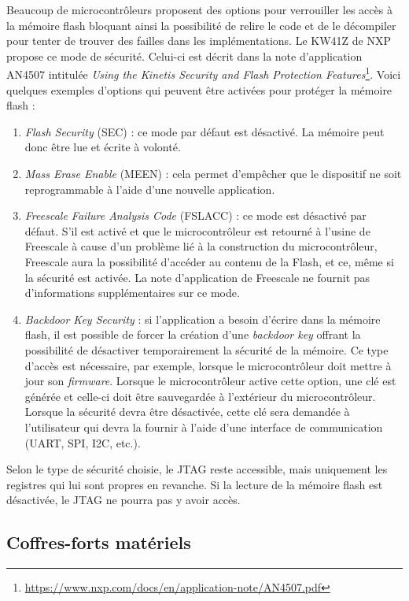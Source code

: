 Beaucoup de microcontrôleurs proposent des options pour verrouiller les accès à la mémoire flash bloquant ainsi la possibilité de relire le code et de le décompiler pour tenter de trouver des failles dans les implémentations. Le KW41Z de NXP propose ce mode de sécurité. Celui-ci est décrit dans la note d'application AN4507 intitulée \textit{Using the Kinetis Security and Flash Protection Features}\footnote{\url{https://www.nxp.com/docs/en/application-note/AN4507.pdf}}. Voici quelques exemples d'options qui peuvent être activées pour protéger la mémoire flash : 
\begin{enumerate}
    \item \textit{Flash Security} (SEC) : ce mode par défaut est désactivé. La mémoire peut donc être lue et écrite à volonté.
    \item \textit{Mass Erase Enable} (MEEN) : cela permet d'empêcher que le dispositif ne soit reprogrammable à l'aide d'une nouvelle application.
    \item \textit{Freescale Failure Analysis Code} (FSLACC) : ce mode est désactivé par défaut. S’il est activé et que le microcontrôleur est retourné à l'usine de Freescale à cause d'un problème lié à la construction du microcontrôleur, Freescale aura la possibilité d'accéder au contenu de la Flash, et ce, même si la sécurité est activée. La note d'application de Freescale ne fournit pas d'informations supplémentaires sur ce mode.
    \item \textit{Backdoor Key Security} : si l'application a besoin d'écrire dans la mémoire flash, il est possible de forcer la création d'une \textit{backdoor key} offrant la possibilité de désactiver temporairement la sécurité de la mémoire. Ce type d'accès est nécessaire, par exemple, lorsque le microcontrôleur doit mettre à jour son \textit{firmware}. Lorsque le microcontrôleur active cette option, une clé est générée et celle-ci doit être sauvegardée à l'extérieur du microcontrôleur. Lorsque la sécurité devra être désactivée, cette clé sera demandée à l'utilisateur qui devra la fournir à l'aide d'une interface de communication (UART, SPI, I2C, etc.).
\end{enumerate}

Selon le type de sécurité choisie, le JTAG reste accessible, mais uniquement les registres qui lui sont propres en revanche. Si la lecture de la mémoire flash est désactivée, le JTAG ne pourra pas y avoir accès.


\subsection{Coffres-forts matériels}
\label{sec-mcu_stsafe}

